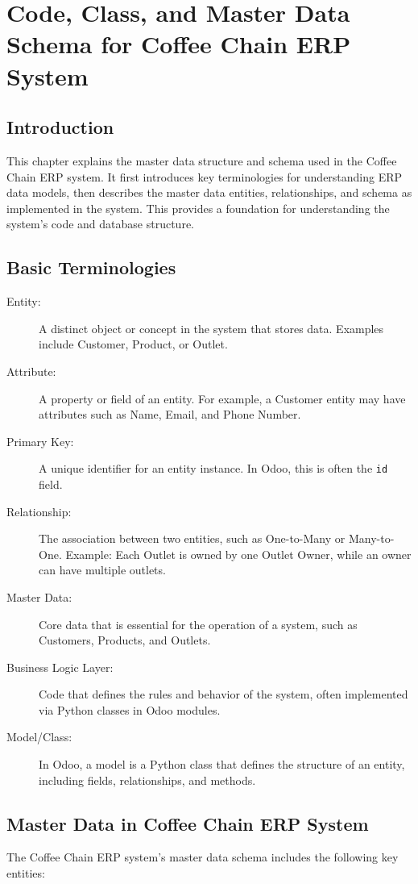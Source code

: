 \chapter{Code, Class, and Master Data Schema for Coffee Chain ERP System}

\section*{Introduction}
This chapter explains the master data structure and schema used in the Coffee Chain ERP system. It first introduces key terminologies for understanding ERP data models, then describes the master data entities, relationships, and schema as implemented in the system. This provides a foundation for understanding the system’s code and database structure.

\section*{Basic Terminologies}

\begin{description}
    \item[Entity:] A distinct object or concept in the system that stores data. Examples include Customer, Product, or Outlet.
    \item[Attribute:] A property or field of an entity. For example, a Customer entity may have attributes such as Name, Email, and Phone Number.
    \item[Primary Key:] A unique identifier for an entity instance. In Odoo, this is often the \texttt{id} field.
    \item[Relationship:] The association between two entities, such as One-to-Many or Many-to-One. Example: Each Outlet is owned by one Outlet Owner, while an owner can have multiple outlets.
    \item[Master Data:] Core data that is essential for the operation of a system, such as Customers, Products, and Outlets.
    \item[Business Logic Layer:] Code that defines the rules and behavior of the system, often implemented via Python classes in Odoo modules.
    \item[Model/Class:] In Odoo, a model is a Python class that defines the structure of an entity, including fields, relationships, and methods.
\end{description}

\section*{Master Data in Coffee Chain ERP System}
The Coffee Chain ERP system’s master data schema includes the following key entities:

